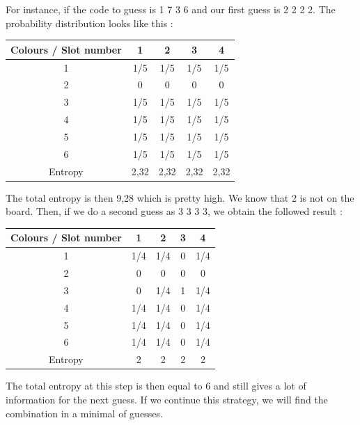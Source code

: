 \documentclass[titlepage]{article}
\begin{document}
For instance, if the code to guess is 1 7 3 6 and our first guess is 2 2 2 2. The probability distribution looks like this : 

\begin{table}[h!]
\centering
\begin{tabular}{|c|c|c|c|c|}
        \hline
        Colours / Slot number & 1 & 2 & 3 & 4 \\ 
        \hline
        1 & 1/5 & 1/5 & 1/5 & 1/5 \\
        \hline
        2 & 0 & 0 & 0 & 0\\
        \hline
        3 & 1/5 & 1/5 & 1/5 & 1/5\\
        \hline
        4 & 1/5 & 1/5 & 1/5 & 1/5 \\
        \hline
        5 & 1/5 & 1/5 & 1/5 & 1/5\\
        \hline
        6 & 1/5 & 1/5 & 1/5 & 1/5 \\
        \hline
        Entropy & 2,32 & 2,32 & 2,32 & 2,32\\
        \hline
\end{tabular}
\end{table}

The total entropy is then 9,28 which is pretty high. We know that 2 is not on the board. Then, if we do a second guess as 3 3 3 3, we obtain the followed result : 

\begin{table}[h!]
\centering
\begin{tabular}{|c|c|c|c|c|}
        \hline
        Colours / Slot number & 1 & 2 & 3 & 4 \\ 
        \hline
        1 & 1/4 & 1/4 & 0 & 1/4 \\
        \hline
        2 & 0 & 0 & 0 & 0\\
        \hline
        3 & 0 & 1/4 & 1 & 1/4\\
        \hline
        4 & 1/4 & 1/4 & 0 & 1/4 \\
        \hline
        5 & 1/4 & 1/4 & 0 & 1/4\\
        \hline
        6 & 1/4 & 1/4 & 0 & 1/4 \\
        \hline
        Entropy & 2 & 2 & 2 & 2\\
        \hline
\end{tabular}
\end{table}
The total entropy at this step is then equal to 6 and still gives a lot of information for the next guess. If we continue this strategy, we will find the combination in a minimal of guesses. 
\end{document}
